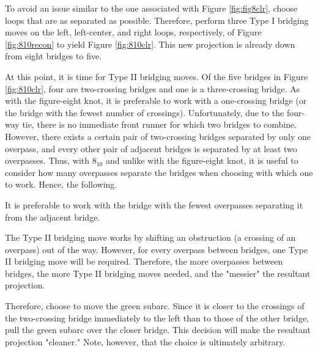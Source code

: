 \documentclass[titlepage]{article}
\begin{document}
To avoid an issue similar to the one associated with Figure \ref{fig:fig8clr}, choose loops that are as separated as possible. Therefore, perform three Type I bridging moves on the left, left-center, and right loops, respectively, of Figure \ref{fig:810recon} to yield Figure \ref{fig:810clr}. This new projection is already down from eight bridges to five.\par
At this point, it is time for Type II bridging moves. Of the five bridges in Figure \ref{fig:810clr}, four are two-crossing bridges and one is a three-crossing bridge. As with the figure-eight knot, it is preferable to work with a one-crossing bridge (or the bridge with the fewest number of crossings). Unfortunately, due to the four-way tie, there is no immediate front runner for which two bridges to combine. However, there exists a certain pair of two-crossing bridges separated by only one overpass, and every other pair of adjacent bridges is separated by at least two overpasses. Thus, with $8_{10}$ and unlike with the figure-eight knot, it is useful to consider how many overpasses separate the bridges when choosing with which one to work. Hence, the following.\par

\begin{conj}
    It is preferable to work with the bridge with the fewest overpasses separating it from the adjacent bridge.
\end{conj}

The Type II bridging move works by shifting an obstruction (a crossing of an overpass) out of the way. However, for every overpass between bridges, one Type II bridging move will be required. Therefore, the more overpasses between bridges, the more Type II bridging moves needed, and the "messier" the resultant projection.\par
Therefore, choose to move the \textcolor{grx}{green} subarc. Since it is closer to the crossings of the two-crossing bridge immediately to the left than to those of the other bridge, pull the \textcolor{grx}{green} subarc over the closer bridge. This decision will make the resultant projection "cleaner." Note, however, that the choice is ultimately arbitrary.\par
\end{document}

